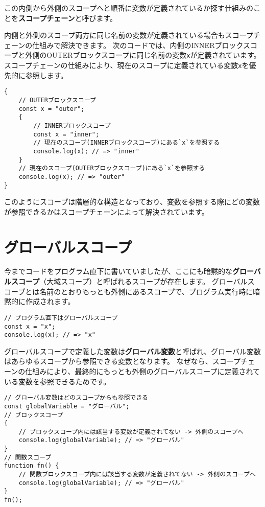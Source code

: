この内側から外側のスコープへと順番に変数が定義されているか探す仕組みのことを\textbf{スコープチェーン}と呼びます。

内側と外側のスコープ両方に同じ名前の変数が定義されている場合もスコープチェーンの仕組みで解決できます。
次のコードでは、内側のINNERブロックスコープと外側のOUTERブロックスコープに同じ名前の変数\texttt{x}が定義されています。
スコープチェーンの仕組みにより、現在のスコープに定義されている変数\texttt{x}を優先的に参照します。

\begin{lstlisting}
{
    // OUTERブロックスコープ
    const x = "outer";
    {
        // INNERブロックスコープ
        const x = "inner";
        // 現在のスコープ(INNERブロックスコープ)にある`x`を参照する
        console.log(x); // => "inner"
    }
    // 現在のスコープ(OUTERブロックスコープ)にある`x`を参照する
    console.log(x); // => "outer"
}
\end{lstlisting}

このようにスコープは階層的な構造となっており、変数を参照する際にどの変数が参照できるかはスコープチェーンによって解決されています。

\hypertarget{global-scope}{%
\section{グローバルスコープ}\label{global-scope}}

今までコードをプログラム直下に書いていましたが、ここにも暗黙的な\textbf{グローバルスコープ}（大域スコープ）と呼ばれるスコープが存在します。
グローバルスコープとは名前のとおりもっとも外側にあるスコープで、プログラム実行時に暗黙的に作成されます。

\begin{lstlisting}
// プログラム直下はグローバルスコープ
const x = "x";
console.log(x); // => "x"
\end{lstlisting}

グローバルスコープで定義した変数は\textbf{グローバル変数}と呼ばれ、グローバル変数はあらゆるスコープから参照できる変数となります。
なぜなら、スコープチェーンの仕組みにより、最終的にもっとも外側のグローバルスコープに定義されている変数を参照できるためです。

\begin{lstlisting}
// グローバル変数はどのスコープからも参照できる
const globalVariable = "グローバル";
// ブロックスコープ
{   
    // ブロックスコープ内には該当する変数が定義されてない -> 外側のスコープへ
    console.log(globalVariable); // => "グローバル"
}
// 関数スコープ
function fn() {
    // 関数ブロックスコープ内には該当する変数が定義されてない -> 外側のスコープへ
    console.log(globalVariable); // => "グローバル"
}
fn();
\end{lstlisting}

